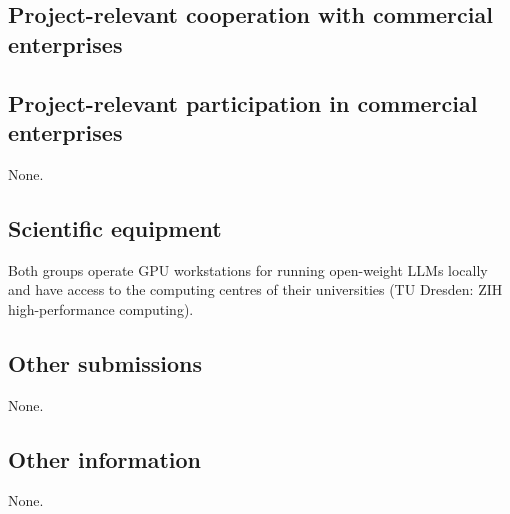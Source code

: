 
\subsection{Project-relevant cooperation with commercial enterprises}

\subsection{Project-relevant participation in commercial enterprises}
None. 

\subsection{Scientific equipment}
Both groups operate GPU workstations for running open-weight \acp{LLM} locally and have access to the computing centres of their universities (TU Dresden: ZIH high-performance computing). 

\subsection{Other submissions}
None.

\subsection{Other information}
None.
